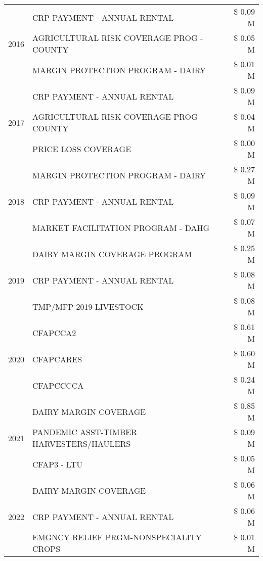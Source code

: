 \begin{tabular}{llr}
\cline{1-3}
\multirow[t]{3}{*}{2016} & CRP PAYMENT - ANNUAL RENTAL & \$ 0.09 M \\
 & AGRICULTURAL RISK COVERAGE PROG - COUNTY & \$ 0.05 M \\
 & MARGIN PROTECTION PROGRAM - DAIRY & \$ 0.01 M \\
\cline{1-3}
\multirow[t]{3}{*}{2017} & CRP PAYMENT - ANNUAL RENTAL & \$ 0.09 M \\
 & AGRICULTURAL RISK COVERAGE PROG - COUNTY & \$ 0.04 M \\
 & PRICE LOSS COVERAGE & \$ 0.00 M \\
\cline{1-3}
\multirow[t]{3}{*}{2018} & MARGIN PROTECTION PROGRAM - DAIRY & \$ 0.27 M \\
 & CRP PAYMENT - ANNUAL RENTAL & \$ 0.09 M \\
 & MARKET FACILITATION PROGRAM - DAHG & \$ 0.07 M \\
\cline{1-3}
\multirow[t]{3}{*}{2019} & DAIRY MARGIN COVERAGE PROGRAM & \$ 0.25 M \\
 & CRP PAYMENT - ANNUAL RENTAL & \$ 0.08 M \\
 & TMP/MFP 2019 LIVESTOCK & \$ 0.08 M \\
\cline{1-3}
\multirow[t]{3}{*}{2020} & CFAPCCA2 & \$ 0.61 M \\
 & CFAPCARES & \$ 0.60 M \\
 & CFAPCCCCA & \$ 0.24 M \\
\cline{1-3}
\multirow[t]{3}{*}{2021} & DAIRY MARGIN COVERAGE & \$ 0.85 M \\
 & PANDEMIC ASST-TIMBER HARVESTERS/HAULERS & \$ 0.09 M \\
 & CFAP3 - LTU & \$ 0.05 M \\
\cline{1-3}
\multirow[t]{3}{*}{2022} & DAIRY MARGIN COVERAGE & \$ 0.06 M \\
 & CRP PAYMENT - ANNUAL RENTAL & \$ 0.06 M \\
 & EMGNCY RELIEF PRGM-NONSPECIALITY CROPS & \$ 0.01 M \\
\cline{1-3}
\bottomrule
\end{tabular}

